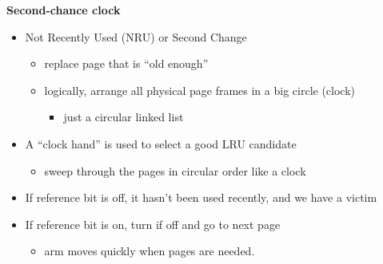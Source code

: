 \documentclass[11pt,a4paper]{article}
\begin{document}
\textbf{Second-chance clock}
\begin{itemize}
    \item Not Recently Used (NRU) or Second Change
        \begin{itemize}
            \item replace page that is ``old enough''
            \item logically, arrange all physical page frames in a big circle (clock)
                \begin{itemize}
                    \item just a circular linked list
                \end{itemize}
        \end{itemize}
    \item A ``clock hand'' is used to select a good LRU candidate
        \begin{itemize}
            \item sweep through the pages in circular order like a clock
        \end{itemize}
    \item If reference bit is off, it hasn't been used recently, and we have a victim
    \item If reference bit is on, turn if off and go to next page
        \begin{itemize}
            \item arm moves quickly when pages are needed.
        \end{itemize}
\end{itemize}
\end{document}
